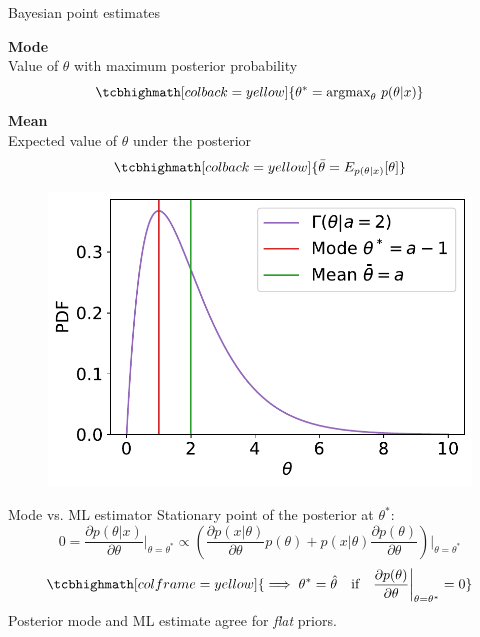 \documentclass[
aspectratio=169,
14pt,
professionalfonts
]{beamer}
\begin{document}
\begin{frame}{Bayesian point estimates}
    \begin{minipage}{0.49\textwidth}
        \textbf{Mode}\\ Value of $\theta$ with maximum posterior probability
            $$
            \tcbhighmath[colback=yellow]{
            \theta^* = \text{argmax}_\theta ~ p(\theta|x)
            }
            $$
        \textbf{Mean}\\ Expected value of $\theta$ under the posterior
            $$
            \tcbhighmath[colback=yellow]{ 
            \bar{\theta} = E_{p(\theta|x)}[\theta]
            }
            $$
    \end{minipage}
    \begin{minipage}{0.49\textwidth}
        \begin{figure}
            \centering
            \includegraphics[width=\linewidth]{../plots/map_vs_mean.pdf}
        \end{figure}
    \end{minipage}
\end{frame}

\begin{frame}{Mode vs. ML estimator}
        Stationary point of the posterior at $\theta^*$:
        $$
        0=\frac{\partial p(\theta|x)}{\partial \theta}\bigg\vert_{\theta = \theta^*} \propto 
        \left(
            \frac{\partial p(x|\theta)}{\partial \theta}p(\theta) + p(x|\theta) \frac{\partial p(\theta)}{\partial \theta}\right)\bigg\vert_{\theta = \theta^*}
        $$
        $$
        \tcbhighmath[colframe=yellow]{
        \implies \theta^* = \hat \theta \quad \text{if} \quad \frac{\partial p(\theta)}{\partial \theta}\bigg\vert_{\theta = \theta^*}=0
        }
        $$
        Posterior mode and ML estimate agree for \textit{flat} priors.
\end{frame}
\end{document}
